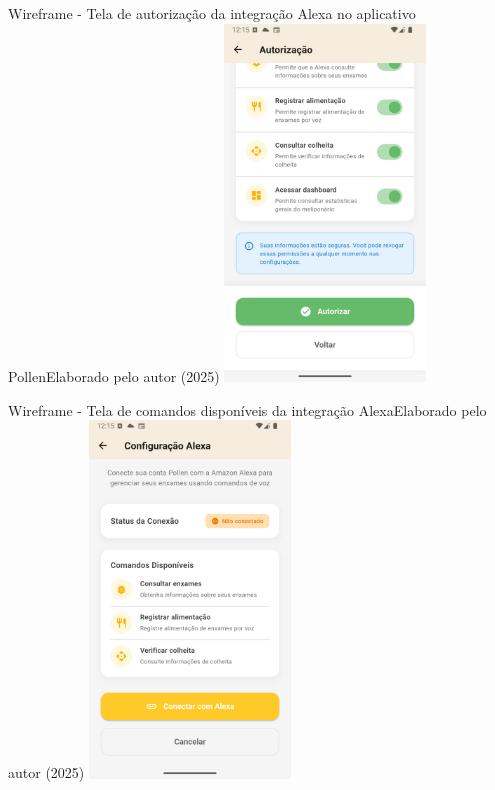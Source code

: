 \begin{figura}{Wireframe - Tela de autorização da integração Alexa no aplicativo Pollen}{Elaborado pelo autor (2025)}
  \centering
  \includegraphics[width=0.4\textwidth]{resources/floats/ilustracoes/autorizacao_alexa_wireframe.png}
  \label{fig:wireframe-autorizacao-alexa}
\end{figura}

\begin{figura}{Wireframe - Tela de comandos disponíveis da integração Alexa}{Elaborado pelo autor (2025)}
  \centering
  \includegraphics[width=0.4\textwidth]{resources/floats/ilustracoes/comandos_disponiveis_wireframe.png}
  \label{fig:wireframe-comandos-disponiveis}
\end{figura}

